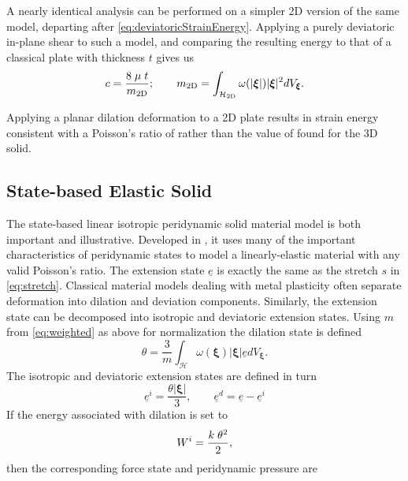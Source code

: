 A nearly identical analysis can be performed on a simpler 2D version of the same model, departing after \cref{eq:deviatoricStrainEnergy}.
Applying a purely deviatoric in-plane shear to such a model, and comparing the resulting energy to that of a classical plate with thickness $t$ gives us
%
\begin{equation}
    c = \frac{8\;\mu\;t}{m_\textrm{2D}};\qquad m_\textrm{2D} =\int_\mathcal{H_\textrm{2D}}\omega(|\boldsymbol{\xi}|)|\boldsymbol{\xi}|^2 dV_{\boldsymbol{\xi}}.  \notag
\end{equation}
%

Applying a planar dilation deformation to a 2D plate results in strain energy consistent with a Poisson's ratio of  rather than the value of  found for the 3D solid.

\subsection{State-based Elastic Solid}
The state-based linear isotropic peridynamic solid material model is both important and illustrative.
Developed in \cite{silling2007peridynamic}, it uses many of the important characteristics of peridynamic states to model a linearly-elastic material with any valid Poisson's ratio.
The extension state $\underline{e}$ is exactly the same as the stretch $s$ in \cref{eq:stretch}.
Classical material models dealing with metal plasticity often separate deformation into dilation and deviation components.
Similarly, the extension state can be decomposed into isotropic and deviatoric extension states. Using $m$ from \cref{eq:weighted} as above for normalization the dilation state is defined
%
\begin{equation}
    \theta = \frac{3}{m} \int_\mathcal{H} \omega(\boldsymbol{\xi}) |\boldsymbol{\xi}| \underline{e} dV_{\boldsymbol{\xi}}.
\end{equation}
%
The isotropic and deviatoric extension states are defined in turn
%
\begin{equation}
\underline{e}^i = \frac{\theta |\boldsymbol{\xi}|}{3},\qquad \underline{e}^d = \underline{e}-\underline{e}^i
\end{equation}
%
If the energy associated with dilation is set to
%
\begin{equation}
W^i = \frac{k\;\theta^2}{2},\notag
\end{equation}
%
then the corresponding force state and peridynamic pressure are 
